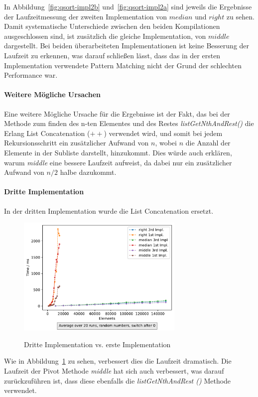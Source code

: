 In Abbildung~\ref{fig:qsort-impl2b} und~\ref{fig:qsort-impl2a} sind jeweils die
Ergebnisse der Laufzeitmessung der zweiten Implementation von \(median\) und
\(right\) zu sehen.
Damit systematische Unterschiede zwischen den beiden Kompilationen
ausgeschlossen sind, ist zusätzlich die gleiche Implementation, von \(middle\)
dargestellt.
Bei beiden überarbeiteten Implementationen ist keine Besserung der Laufzeit zu
erkennen, was darauf schließen lässt, dass das in der ersten Implementation
verwendete Pattern Matching nicht der Grund der schlechten Performance war.

\paragraph{Weitere Mögliche Ursachen}
Eine weitere Mögliche Ursache für die Ergebnisse ist der Fakt, das bei der
Methode zum finden des n-ten Elementes und des Restes
\textit{listGetNthAndRest()} die Erlang List Concatenation (\(++\)) verwendet
wird, und somit bei jedem Rekursionsschritt ein zusätzlicher Aufwand von
\(n\), wobei \(n\) die Anzahl der Elemente in der Subliste darstellt,
hinzukommt.
Dies würde auch erklären, warum \textit{middle} eine bessere Laufzeit
aufweist, da dabei nur ein zusätzlicher Aufwand von \(n/2\) halbe dazukommt.

\paragraph{Dritte Implementation}
In der dritten Implementation wurde die List Concatenation ersetzt.

\begin{figure}[hbt]
    \centering
    \caption{Dritte Implementation vs. erste Implementation}
    \includegraphics[width=8cm]
    {../out/pivotMethods_Implementation3.pdf}\label{fig:qsort-impl3}
\end{figure}

Wie in Abbildung~\ref{fig:qsort-impl3} zu sehen,
verbessert dies die Laufzeit dramatisch.
Die Laufzeit der Pivot Methode \textit{middle} hat sich auch verbessert, was
darauf zurückzuführen ist, dass diese ebenfalls die \textit{listGetNthAndRest
()} Methode verwendet.

